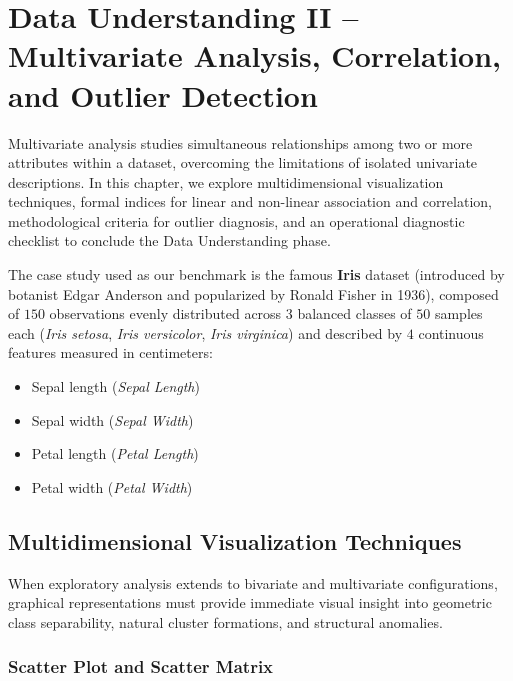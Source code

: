 \chapter{Data Understanding II -- Multivariate Analysis, Correlation, and Outlier Detection}
\label{chap:dm-data-understanding-multivariate-outliers}

Multivariate analysis studies simultaneous relationships among two or more attributes within a dataset, overcoming the limitations of isolated univariate descriptions. In this chapter, we explore multidimensional visualization techniques, formal indices for linear and non-linear association and correlation, methodological criteria for outlier diagnosis, and an operational diagnostic checklist to conclude the Data Understanding phase.

The case study used as our benchmark is the famous \textbf{Iris} dataset (introduced by botanist Edgar Anderson and popularized by Ronald Fisher in 1936), composed of $150$ observations evenly distributed across $3$ balanced classes of $50$ samples each (\textit{Iris setosa}, \textit{Iris versicolor}, \textit{Iris virginica}) and described by $4$ continuous features measured in centimeters:
\begin{itemize}[noitemsep]
    \item Sepal length (\textit{Sepal Length})
    \item Sepal width (\textit{Sepal Width})
    \item Petal length (\textit{Petal Length})
    \item Petal width (\textit{Petal Width})
\end{itemize}

\section{Multidimensional Visualization Techniques}
\label{sec:dm-multivariate-visualization}

When exploratory analysis extends to bivariate and multivariate configurations, graphical representations must provide immediate visual insight into geometric class separability, natural cluster formations, and structural anomalies.

\subsection{Scatter Plot and Scatter Matrix}

